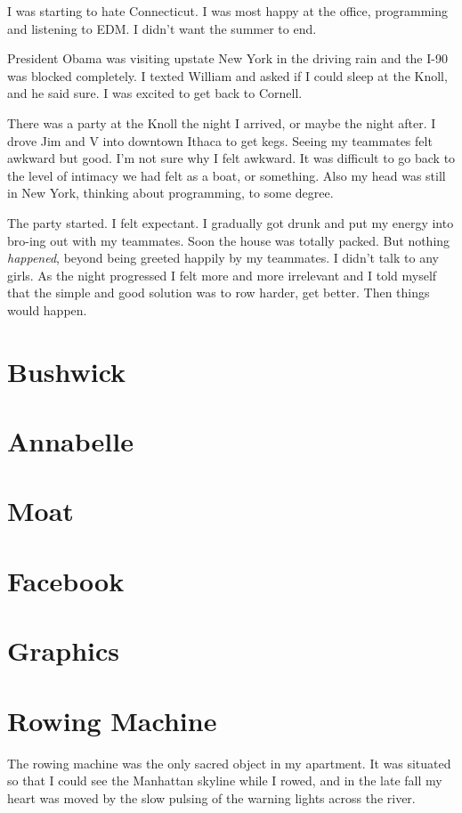 \documentclass[12pt]{article}
\begin{document}
I was starting to hate Connecticut.  I was most happy at the office, programming
and listening to EDM.  I didn't want the summer to end.

President Obama was visiting upstate New York in the driving rain and the I-90
was blocked completely.  I texted William and asked if I could sleep at the
Knoll, and he said sure.  I was excited to get back to Cornell.

There was a party at the Knoll the night I arrived, or maybe the night after.  I
drove Jim and V into downtown Ithaca to get kegs.  Seeing my teammates felt
awkward but good.  I'm not sure why I felt awkward.  It was difficult to go back
to the level of intimacy we had felt as a boat, or something.  Also my head was
still in New York, thinking about programming, to some degree.    

The party started.  I felt expectant.  I gradually got drunk and put my energy
into bro-ing out with my teammates.  Soon the house was totally packed.  But
nothing \textit{happened}, beyond being greeted happily by my teammates.  I
didn't talk to any girls.  As the night progressed I felt more and more
irrelevant and I told myself that the simple and good solution was to row
harder, get better.  Then things would happen.


\section{Bushwick}


\section{Annabelle}


\section{Moat}


\section{Facebook}


\section{Graphics}


\section{Rowing Machine}
The rowing machine was the only sacred object in my apartment.  It was situated
so that I could see the Manhattan skyline while I rowed, and in the late fall
my heart was moved by the slow pulsing of the warning lights across the river.
\end{document}
